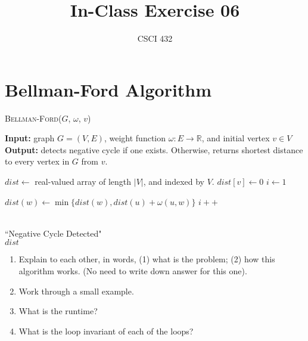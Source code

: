 \documentclass{article}
\title{In-Class Exercise 06}
\author{CSCI 432}
\def\R{{\mathbb R}}
\begin{document}
\maketitle

\section*{Bellman-Ford Algorithm}
\begin{algorithm}\caption{\textsc{Bellman-Ford}($G$, $\omega$, $v$)}\label{alg:seb}
    {\bf Input:} graph $G=(V,E)$, weight function $\omega \colon E \to \R$, and initial vertex $v \in V$ \\
    {\bf Output:} detects negative cycle if one exists.  Otherwise, returns
    shortest distance to every vertex in $G$ from $v$.\\
    \begin{algorithmic}[1]
        \State $dist \gets$ real-valued array of length $|V|$, and indexed by $V$.
        \State $dist[v] \gets 0$
        \State $i \gets 1$

                \State $dist(w) \gets \min \{ dist(w), dist(u)+ \omega(u,w) \}$
            \EndFor
            \State $i++$
        \EndWhile

            \\
                \quad\quad\quad \Return ``Negative Cycle Detected"
            \EndIf
        \EndFor\\
        \Return $dist$
    \end{algorithmic}
\end{algorithm}

\begin{enumerate}
    \item Explain to each other, in words, (1) what is the problem; (2) how this
        algorithm works.  (No need to write down answer for this one).
    \item Work through a small example.
    \item What is the runtime?
    \item What is the loop invariant of each of the loops?
\end{enumerate}
\end{document}
